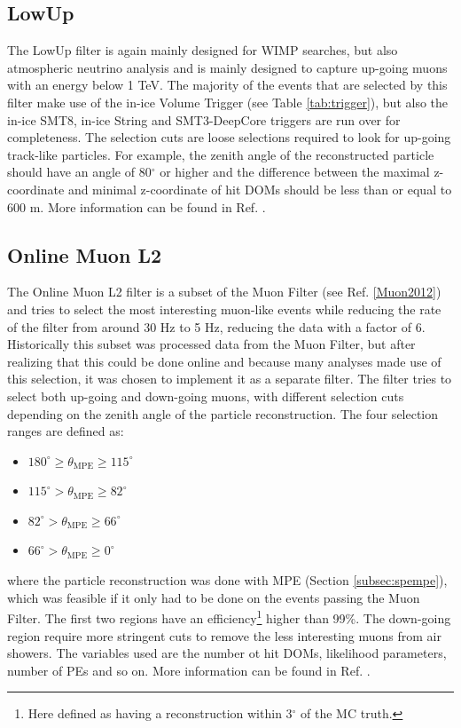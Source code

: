
\subsection{LowUp}
The LowUp filter is again mainly designed for WIMP searches, but also atmospheric neutrino analysis and is mainly designed to capture up-going muons with an energy below 1 TeV. The majority of the events that are selected by this filter make use of the in-ice Volume Trigger (see Table \ref{tab:trigger}), but also the in-ice SMT8, in-ice String and SMT3-DeepCore triggers are run over for completeness. The selection cuts are loose selections required to look for up-going track-like particles. For example, the zenith angle of the reconstructed particle should have an angle of 80$^\circ$ or higher and the difference between the maximal z-coordinate and minimal z-coordinate of hit DOMs should be less than or equal to 600 m. More information can be found in Ref. \cite{LowUp2012}.


\subsection{Online Muon L2}
The Online Muon L2 filter is a subset of the Muon Filter (see Ref. \ref{Muon2012}) and tries to select the most interesting muon-like events while reducing the rate of the filter from around 30 Hz to 5 Hz, reducing the data with a factor of 6. Historically this subset was processed data from the Muon Filter, but after realizing that this could be done online and because many analyses made use of this selection, it was chosen to implement it as a separate filter. The filter tries to select both up-going and down-going muons, with different selection cuts depending on the zenith angle of the particle reconstruction. The four selection ranges are defined as:
\vspace{2mm}
\begin{itemize}
\item $180^\circ \geq \theta_\textrm{MPE} \geq 115^\circ$
\item $115^\circ > \theta_\textrm{MPE} \geq 82^\circ$
\item $82^\circ > \theta_\textrm{MPE} \geq 66^\circ$
\item $66^\circ > \theta_\textrm{MPE} \geq 0^\circ$
\end{itemize}
where the particle reconstruction was done with MPE (Section \ref{subsec:spempe}), which was feasible if it only had to be done on the events passing the Muon Filter. The first two regions have an efficiency\footnote{Here defined as having a reconstruction within 3$^\circ$ of the MC truth.} higher than 99\%. The down-going region require more stringent cuts to remove the less interesting muons from air showers. The variables used are the number ot hit DOMs, likelihood parameters, number of PEs and so on. More information can be found in Ref. \cite{OnlineMuonL22012}.


